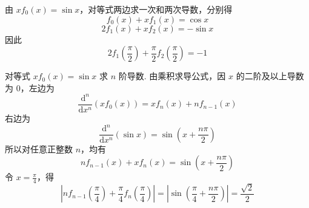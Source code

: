 \begin{solution}
由 \(xf_0(x)=\sin x\)，对等式两边求一次和两次导数，分别得
\[
f_0(x)+xf_1(x)=\cos x
\]
\[
2f_1(x)+xf_2(x)=-\sin x
\]
因此
\[
2f_1\left(\frac{\pi}{2}\right)+\frac{\pi}{2}f_2\left(\frac{\pi}{2}\right)=-1
\]

对等式 \(xf_0(x)=\sin x\) 求 \(n\) 阶导数. 由乘积求导公式，因 \(x\) 的二阶及以上导数为 \(0\)，左边为
\[
\frac{\mathrm d^n}{\mathrm d x^n}\left(xf_0(x)\right)=xf_n(x)+nf_{n-1}(x)
\]
右边为
\[
\frac{\mathrm d^n}{\mathrm d x^n}(\sin x)=\sin\left(x+\frac{n\pi}{2}\right)
\]
所以对任意正整数 \(n\)，均有
\[
nf_{n-1}(x)+xf_n(x)=\sin\left(x+\frac{n\pi}{2}\right)
\]
令 \(x=\frac\pi4\)，得
\[
\left|nf_{n-1}\left(\frac\pi4\right)+\frac\pi4f_n\left(\frac\pi4\right)\right|=\left|\sin\left(\frac\pi4+\frac{n\pi}{2}\right)\right|=\frac{\sqrt2}{2}
\]
\end{solution}
